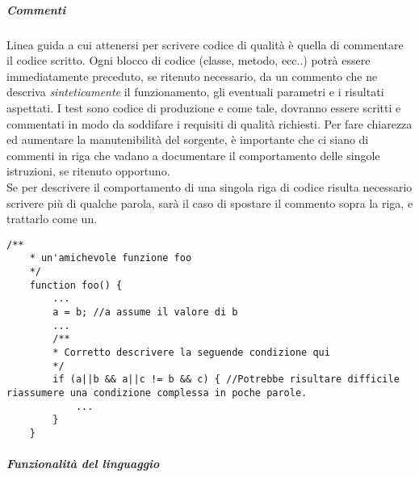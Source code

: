 \subparagraph{Commenti}
\label{ssub:codifica:commenti}
Linea guida a cui attenersi per scrivere codice di qualità è quella di commentare il codice scritto.
Ogni blocco di codice (classe, metodo, ecc..) potrà essere immediatamente preceduto, se ritenuto necessario, da un commento che ne descriva
\emph{sinteticamente} il funzionamento, gli eventuali parametri e i risultati aspettati.
I test sono codice di produzione e come tale, dovranno essere scritti e commentati in modo da soddifare i requisiti di qualità richiesti.
Per fare chiarezza ed aumentare la manutenibilità del sorgente, è importante che ci siano di commenti in riga che vadano a documentare il
comportamento delle singole istruzioni, se ritenuto opportuno.\\
Se per descrivere il comportamento di una singola riga di codice risulta necessario
scrivere più di qualche parola, sarà il caso di spostare il commento sopra la riga, e trattarlo come un.
\begin{lstlisting}[style=htmlcssjs]
    /**
    * un'amichevole funzione foo
    */
    function foo() {
        ...
        a = b; //a assume il valore di b
        ...
        /**
        * Corretto descrivere la seguende condizione qui
        */
        if (a||b && a||c != b && c) { //Potrebbe risultare difficile riassumere una condizione complessa in poche parole.
            ...
        }
    }
\end{lstlisting}


\subparagraph{Funzionalità del linguaggio}

